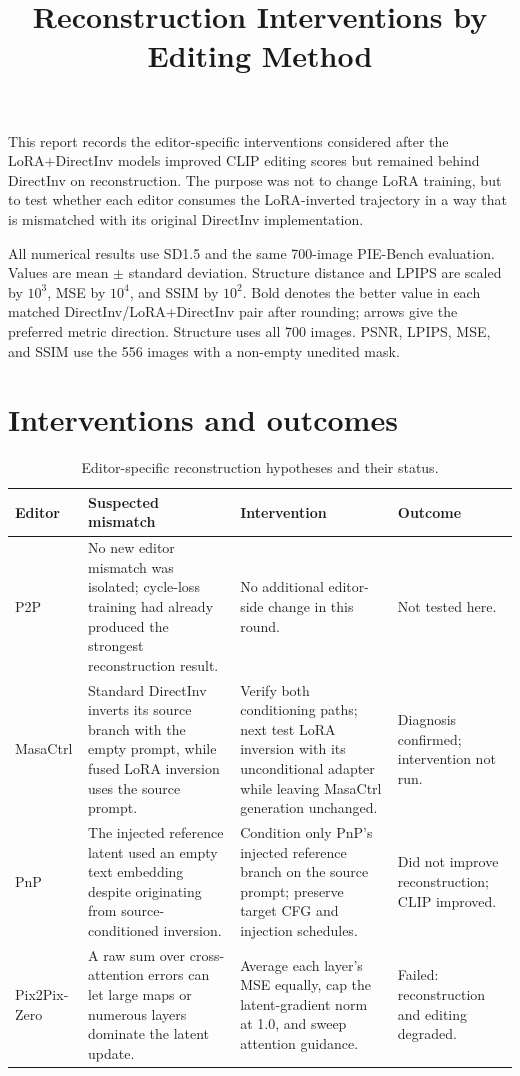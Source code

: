 \documentclass[10pt]{article}
\title{Reconstruction Interventions by Editing Method}
\date{}
\begin{document}
\maketitle

This report records the editor-specific interventions considered after the
LoRA+DirectInv models improved CLIP editing scores but remained behind
DirectInv on reconstruction. The purpose was not to change LoRA training, but
to test whether each editor consumes the LoRA-inverted trajectory in a way that
is mismatched with its original DirectInv implementation.

All numerical results use SD1.5 and the same 700-image PIE-Bench evaluation.
Values are mean $\pm$ standard deviation. Structure distance and LPIPS are
scaled by $10^3$, MSE by $10^4$, and SSIM by $10^2$. Bold denotes the better
value in each matched DirectInv/LoRA+DirectInv pair after rounding; arrows give
the preferred metric direction. Structure uses all 700 images. PSNR, LPIPS,
MSE, and SSIM use the 556 images with a non-empty unedited mask.

\section*{Interventions and outcomes}

\begin{table}[htbp]
  \centering
  \small
  \setlength{\tabcolsep}{4pt}
  \begin{tabular}{p{1.7cm}p{4.2cm}p{5.1cm}p{3.4cm}}
    \toprule
    Editor & Suspected mismatch & Intervention & Outcome \\
    \midrule
    P2P & No new editor mismatch was isolated; cycle-loss training had already
    produced the strongest reconstruction result. & No additional editor-side
    change in this round. & Not tested here. \\
    \addlinespace
    MasaCtrl & Standard DirectInv inverts its source branch with the empty
    prompt, while fused LoRA inversion uses the source prompt. & Verify both
    conditioning paths; next test LoRA inversion with its unconditional adapter
    while leaving MasaCtrl generation unchanged. & Diagnosis confirmed;
    intervention not run. \\
    \addlinespace
    PnP & The injected reference latent used an empty text embedding despite
    originating from source-conditioned inversion. & Condition only PnP's
    injected reference branch on the source prompt; preserve target CFG and
    injection schedules. & Did not improve reconstruction; CLIP improved. \\
    \addlinespace
    Pix2Pix-Zero & A raw sum over cross-attention errors can let large maps or
    numerous layers dominate the latent update. & Average each layer's MSE
    equally, cap the latent-gradient norm at 1.0, and sweep attention guidance.
    & Failed: reconstruction and editing degraded. \\
    \bottomrule
  \end{tabular}
  \caption{Editor-specific reconstruction hypotheses and their status.}
  \label{tab:intervention-summary}
\end{table}
\end{document}
